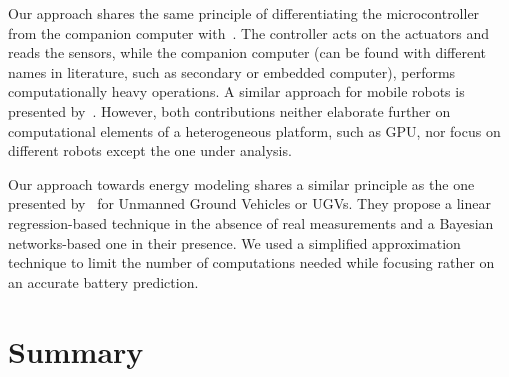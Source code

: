 Our approach shares the same principle of differentiating the microcontroller from the companion computer with~\citep{mei2004energy, mei2005case}. The controller acts on the actuators and reads the sensors, while the companion computer (can be found with different names in literature, such as secondary or embedded computer), performs computationally heavy operations. A similar approach for mobile robots is presented by~\citep{dressler2005energy}. However, both contributions neither elaborate further on computational elements of a heterogeneous platform, such as GPU, nor focus on different robots except the one under analysis.

Our approach towards energy modeling shares a similar principle as the one presented by~\citep{sadrpour2013mission, sadrpour2013experimental} for Unmanned Ground Vehicles or UGVs. They propose a linear regression-based technique in the absence of real measurements and a Bayesian networks-based one in their presence. We used a simplified approximation technique to limit the number of computations needed while focusing rather on an accurate battery prediction.

\section{\color{red}Summary}


